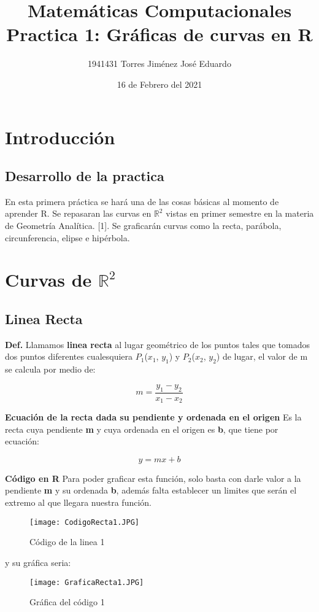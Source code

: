 \documentclass{article}
\title{Matemáticas Computacionales \\ Practica 1: Gráficas de curvas en R}
\author{1941431 Torres Jiménez José Eduardo}
\date{16 de Febrero del 2021}
\begin{document}
\maketitle

\section{Introducción}
\subsection{Desarrollo de la practica}
En esta primera práctica se hará una de las cosas básicas al momento de aprender R. Se repasaran las curvas en $\mathbb{R}^2$
vistas en primer semestre en la materia de Geometría Analítica. [1].
Se graficarán curvas como la recta, parábola, circunferencia, elipse e hipérbola.

\section{Curvas de $\mathbb{R}^2$ }
\subsection{Linea Recta}
\textbf{Def.} Llamamos \textbf{linea recta} al lugar geométrico de los puntos tales que tomados dos puntos diferentes cualesquiera $P_1$($x_1$, $y_1$) y $P_2$($x_2$, $y_2$) de lugar, el valor de m se calcula por medio de:

\begin{equation}
m = \frac{y_1-y_2}{x_1-x_2}
\end{equation}

\textbf{Ecuación de la recta dada su pendiente y ordenada en el origen} Es la recta cuya pendiente \textbf{m} y cuya ordenada en el origen es \textbf{b}, que tiene por ecuación:

\begin{equation}
y = mx+b
\end{equation}

\textbf{Código en R}
\newline Para poder graficar esta función, solo basta con darle valor a la pendiente \textbf{m} y su ordenada \textbf{b}, además falta establecer un limites que serán el extremo al que llegara nuestra función.
\newpage

\begin{figure}
\raggedright
\texttt{[image: CodigoRecta1.JPG]}
\caption{Código de la linea 1}
\label{fig:mesh1}
\end{figure}
y su gráfica seria:
\begin{figure}[h]
\centering
\texttt{[image: GraficaRecta1.JPG]}
\caption{Gráfica del código 1}
\label{fig:mesh2}
\end{figure}
\end{document}
